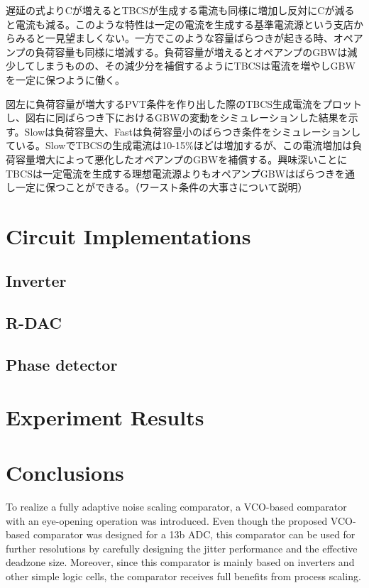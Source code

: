 \documentclass[letterpaper, 10 pt, conference]{ieeeconf}  %
\begin{document}
遅延の式よりCが増えるとTBCSが生成する電流も同様に増加し反対にCが減ると電流も減る。このような特性は一定の電流を生成する基準電流源という支店からみると一見望ましくない。一方でこのような容量ばらつきが起きる時、オペアンプの負荷容量も同様に増減する。負荷容量が増えるとオペアンプのGBWは減少してしまうものの、その減少分を補償するようにTBCSは電流を増やしGBWを一定に保つように働く。

図左に負荷容量が増大するPVT条件を作り出した際のTBCS生成電流をプロットし、図右に同ばらつき下におけるGBWの変動をシミュレーションした結果を示す。Slowは負荷容量大、Fastは負荷容量小のばらつき条件をシミュレーションしている。SlowでTBCSの生成電流は10-15\%ほどは増加するが、この電流増加は負荷容量増大によって悪化したオペアンプのGBWを補償する。興味深いことにTBCSは一定電流を生成する理想電流源よりもオペアンプGBWはばらつきを通し一定に保つことができる。（ワースト条件の大事さについて説明）


\section{Circuit Implementations}
\subsection{Inverter}


\subsection{R-DAC}

\subsection{Phase detector}


\section{Experiment Results}


\section{Conclusions}
To realize a fully adaptive noise scaling comparator, a VCO-based comparator with an eye-opening operation was introduced.  Even though the proposed VCO-based comparator was designed for a 13b ADC, this comparator can be used for further resolutions by carefully designing the jitter performance and the effective deadzone size. Moreover, since this comparator is mainly based on inverters and other simple logic cells, the comparator receives full benefits from process scaling. %
\end{document}
